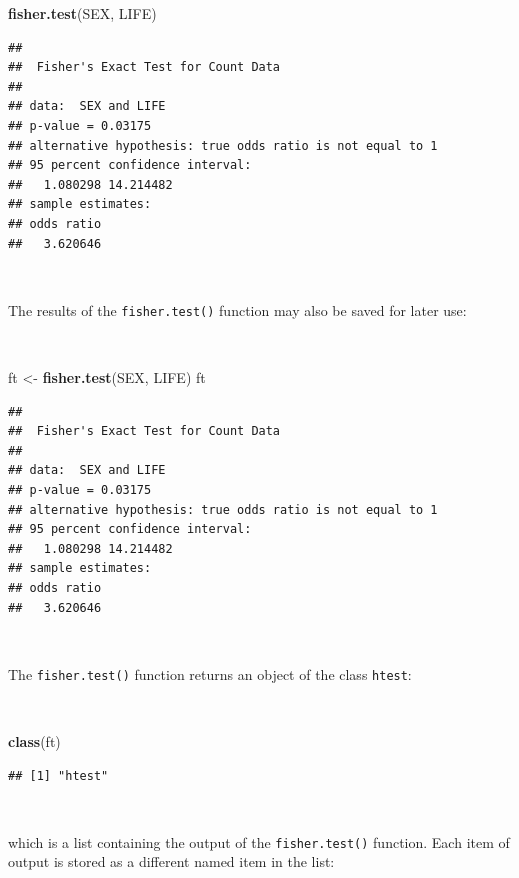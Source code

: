 \documentclass[12pt,a4paper]{book}
\newenvironment{Shaded}{\begin{snugshade}}{\end{snugshade}}
\newcommand{\KeywordTok}[1]{\textcolor[rgb]{0.13,0.29,0.53}{\textbf{#1}}}
\newcommand{\NormalTok}[1]{#1}
\newcommand{\StringTok}[1]{\textcolor[rgb]{0.31,0.60,0.02}{#1}}
\theoremstyle{definition}
\theoremstyle{definition}
\theoremstyle{definition}
\theoremstyle{remark}
\begin{document}
\begin{Shaded}
\begin{Highlighting}[]
\KeywordTok{fisher.test}\NormalTok{(SEX, LIFE)}
\end{Highlighting}
\end{Shaded}

\begin{verbatim}
## 
##  Fisher's Exact Test for Count Data
## 
## data:  SEX and LIFE
## p-value = 0.03175
## alternative hypothesis: true odds ratio is not equal to 1
## 95 percent confidence interval:
##   1.080298 14.214482
## sample estimates:
## odds ratio 
##   3.620646
\end{verbatim}

~

The results of the \texttt{fisher.test()} function may also be saved for
later use:

~

\begin{Shaded}
\begin{Highlighting}[]
\NormalTok{ft <-}\StringTok{ }\KeywordTok{fisher.test}\NormalTok{(SEX, LIFE)}
\NormalTok{ft}
\end{Highlighting}
\end{Shaded}

\begin{verbatim}
## 
##  Fisher's Exact Test for Count Data
## 
## data:  SEX and LIFE
## p-value = 0.03175
## alternative hypothesis: true odds ratio is not equal to 1
## 95 percent confidence interval:
##   1.080298 14.214482
## sample estimates:
## odds ratio 
##   3.620646
\end{verbatim}

~

The \texttt{fisher.test()} function returns an object of the class
\texttt{htest}:

~

\begin{Shaded}
\begin{Highlighting}[]
\KeywordTok{class}\NormalTok{(ft)}
\end{Highlighting}
\end{Shaded}

\begin{verbatim}
## [1] "htest"
\end{verbatim}

~

which is a list containing the output of the \texttt{fisher.test()}
function. Each item of output is stored as a different named item in the
list:
\end{document}
